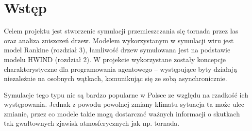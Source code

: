 \section{Wstęp}

Celem projektu jest stworzenie symulacji przemieszczania się tornada przez las oraz analiza zniszczeń drzew. Modelem wykorzystanym w symulacji wiru jest model Rankine (rozdział 3), łamliwość drzew symulowana jest na podstawie modelu HWIND (rozdział 2). W projekcie wykorzystane zostały koncepcje charakterystyczne dla programowania agentowego -- występujące byty działają niezależnie na osobnych wątkach, komunikując się ze sobą asynchronicznie.

Symulacje tego typu nie są bardzo popularne w Polsce ze względu na rzadkość ich występowania. Jednak z powodu powolnej zmiany klimatu sytuacja ta może ulec zmianie, przez co modele takie mogą dostarczać ważnych informacji o skutkach tak gwałtownych zjawisk atmosferycznych jak np. tornada.